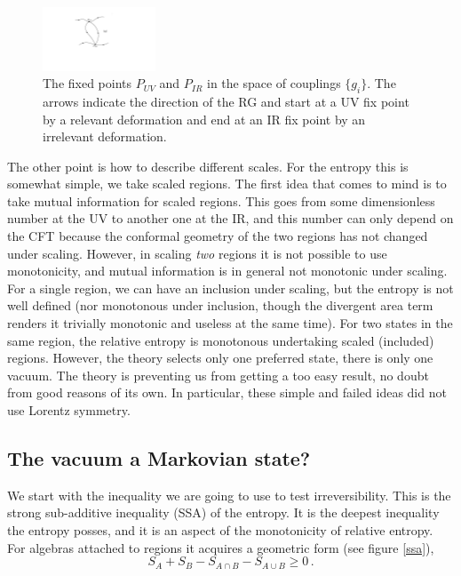 \documentclass[11pt]{article}
\numberwithin{equation}{section}
\newcommand{\be}{\begin{equation}}
\newcommand{\ee}{\end{equation}}
\begin{document}
\begin{figure}[t]
\begin{center}  
\includegraphics[width=0.3\textwidth]{rg.pdf}
\captionsetup{width=0.9\textwidth}
\caption{The fixed points $P_{UV}$ and $P_{IR}$ in the space of couplings $\{g_i\}$. The arrows indicate the direction of the RG and start at a UV fix point by a relevant deformation and end at an IR fix point by an irrelevant deformation.}
\label{rg}
\end{center}  
\end{figure}

The other point is how to describe different scales. For the entropy this is somewhat simple, we take scaled regions. The first idea that comes to mind is to take mutual information for scaled regions. This goes from some dimensionless number at the UV to another one at the IR, and this number can only depend on the CFT because the conformal geometry of the two regions has not changed under scaling. However, in scaling {\sl two} regions it is not possible to use monotonicity, and mutual information is in general not monotonic under scaling. For a single region, we can have an inclusion under scaling, but the entropy is not well defined (nor monotonous under inclusion, though the divergent area term renders it trivially monotonic and useless at the same time). For two states in the same region, the relative entropy is monotonous undertaking scaled (included) regions. However, the theory selects only one preferred state, there is only one vacuum. The theory is preventing us from getting a too easy result, no doubt from good reasons of its own. In particular, these simple and failed ideas did not use Lorentz symmetry.     

\subsection{The vacuum a Markovian state?}
We start with the inequality we are going to use to test irreversibility. This is the strong sub-additive inequality (SSA) of the entropy. It is the deepest inequality the entropy posses, and it is an aspect of the monotonicity of relative entropy. For algebras attached to regions it acquires a geometric form (see figure \ref{ssa}),
\be\label{markov0}
S_A+S_B-S_{A\cap B}-S_{A\cup B}\ge 0\,. 
\ee
\end{document}
